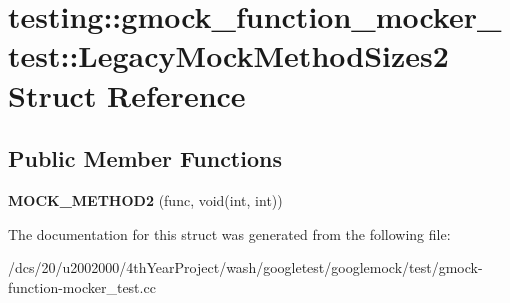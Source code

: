 \hypertarget{structtesting_1_1gmock__function__mocker__test_1_1LegacyMockMethodSizes2}{}\section{testing\+:\+:gmock\+\_\+function\+\_\+mocker\+\_\+test\+:\+:Legacy\+Mock\+Method\+Sizes2 Struct Reference}
\label{structtesting_1_1gmock__function__mocker__test_1_1LegacyMockMethodSizes2}
\subsection*{Public Member Functions}
\begin{DoxyCompactItemize}
\item 
\mbox{\label{structtesting_1_1gmock__function__mocker__test_1_1LegacyMockMethodSizes2_aaa518e5f35d8862f05064cb13381ab31}} 
{\bfseries M\+O\+C\+K\+\_\+\+M\+E\+T\+H\+O\+D2} (func, void(int, int))
\end{DoxyCompactItemize}


The documentation for this struct was generated from the following file\+:\begin{DoxyCompactItemize}
\item 
/dcs/20/u2002000/4th\+Year\+Project/wash/googletest/googlemock/test/gmock-\/function-\/mocker\+\_\+test.\+cc\end{DoxyCompactItemize}
